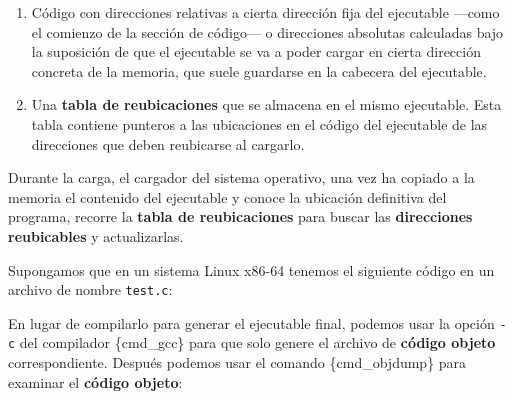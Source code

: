 \begin{enumerate}
\def\labelenumi{\arabic{enumi}.}
\item
  Código con direcciones relativas a cierta dirección fija del
  ejecutable ---como el comienzo de la sección de código--- o
  direcciones absolutas calculadas bajo la suposición de que el
  ejecutable se va a poder cargar en cierta dirección concreta de la
  memoria, que suele guardarse en la cabecera del ejecutable.
\item
  Una \textbf{tabla de reubicaciones}{} que se almacena en el mismo
  ejecutable. Esta tabla contiene punteros a las ubicaciones en el
  código del ejecutable de las direcciones que deben reubicarse al
  cargarlo.
\end{enumerate}

Durante la carga, el cargador del sistema operativo, una vez ha copiado
a la memoria el contenido del ejecutable y conoce la ubicación
definitiva del programa, recorre la \textbf{tabla de reubicaciones} para
buscar las \textbf{direcciones reubicables} y actualizarlas.

Supongamos que en un sistema Linux x86-64 tenemos el siguiente código en
un archivo de nombre \texttt{test.c}:

\begin{Shaded}
\begin{Highlighting}[]
\OperatorTok{=} \OperatorTok{;}

\OperatorTok{()}
\OperatorTok{\{}
\OperatorTok{=} \OperatorTok{;}
     \OperatorTok{;}
\OperatorTok{\}}

\OperatorTok{()}
\OperatorTok{\{}
\OperatorTok{=} \OperatorTok{;}
    \OperatorTok{();}
\OperatorTok{\}}
\end{Highlighting}
\end{Shaded}

En lugar de compilarlo para generar el ejecutable final, podemos usar la
opción \texttt{-c} del compilador \{cmd\_gcc\} para que solo genere el
archivo de \textbf{código objeto} correspondiente. Después podemos usar
el comando \{cmd\_objdump\} para examinar el \textbf{código objeto}:


